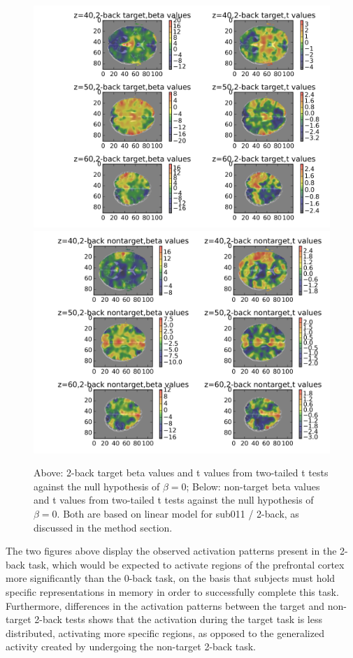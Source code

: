 \documentclass[11pt]{article}
\begin{document}
\begin{figure}
\centering
\includegraphics[scale=0.7]{../results/sub011_target_betas_2_back.png}
\includegraphics[scale=0.7]{../results/sub011_nontarget_betas_2_back.png}
\caption{Above: 2-back target beta values and t values from two-tailed t tests against the null hypothesis of $\beta = 0$; Below: non-target beta values and t values from two-tailed t tests against the null hypothesis of $\beta = 0$. Both are based on linear model for sub011 / 2-back, as discussed in the method section.}
\end{figure}

The two figures above display the observed activation patterns present in the 2-back task, which would be expected to activate regions of the prefrontal cortex more significantly than the 0-back task, on the basis that subjects must hold specific representations in memory in order to successfully complete this task. Furthermore, differences in the activation patterns between the target and non-target 2-back tests shows that the activation during the target task is less distributed, activating more specific regions, as opposed to the generalized activity created by undergoing the non-target 2-back task.
\end{document}
